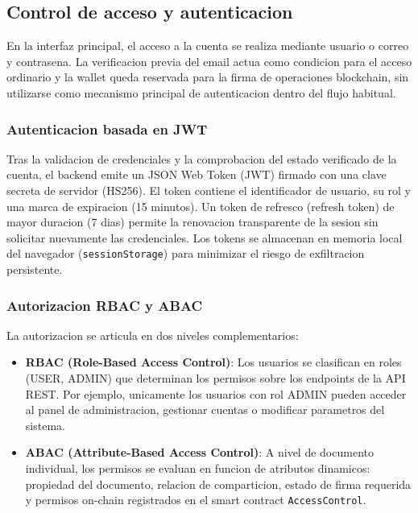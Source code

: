 \documentclass[11pt, a4paper]{article}
\begin{document}
\subsection{Control de acceso y autenticacion}

En la interfaz principal, el acceso a la cuenta se realiza mediante usuario o correo y contrasena. La verificacion previa del email actua como condicion para el acceso ordinario y la wallet queda reservada para la firma de operaciones blockchain, sin utilizarse como mecanismo principal de autenticacion dentro del flujo habitual.

\subsubsection{Autenticacion basada en JWT}

Tras la validacion de credenciales y la comprobacion del estado verificado de la cuenta, el backend emite un JSON Web Token (JWT) firmado con una clave secreta de servidor (HS256). El token contiene el identificador de usuario, su rol y una marca de expiracion (15 minutos). Un token de refresco (refresh token) de mayor duracion (7 dias) permite la renovacion transparente de la sesion sin solicitar nuevamente las credenciales. Los tokens se almacenan en memoria local del navegador (\texttt{sessionStorage}) para minimizar el riesgo de exfiltracion persistente.

\subsubsection{Autorizacion RBAC y ABAC}

La autorizacion se articula en dos niveles complementarios:
\begin{itemize}
    \item \textbf{RBAC (Role-Based Access Control)}: Los usuarios se clasifican en roles (USER, ADMIN) que determinan los permisos sobre los endpoints de la API REST. Por ejemplo, unicamente los usuarios con rol ADMIN pueden acceder al panel de administracion, gestionar cuentas o modificar parametros del sistema.
    \item \textbf{ABAC (Attribute-Based Access Control)}: A nivel de documento individual, los permisos se evaluan en funcion de atributos dinamicos: propiedad del documento, relacion de comparticion, estado de firma requerida y permisos on-chain registrados en el smart contract \texttt{AccessControl}.
\end{itemize}
\end{document}
